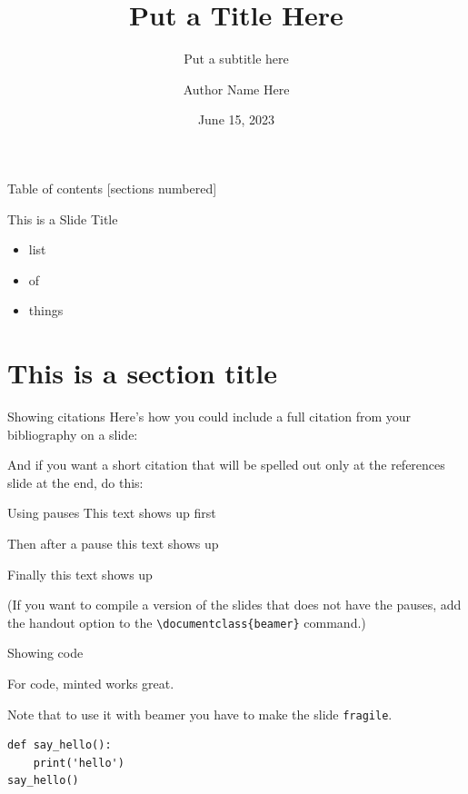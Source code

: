\documentclass[10pt,aspectratio=169,dvipsnames]{beamer}
\title{Put a Title Here}
\subtitle{Put a subtitle here}
\date{June 15, 2023}
\author{Author Name Here}
\begin{document}
\maketitle


\begin{frame}{Table of contents}
[sections numbered]
\tableofcontents[hideallsubsections]
\end{frame}




\begin{frame}{This is a Slide Title}
\begin{itemize}\itemsep1em
\item list
\item of
\item things
\end{itemize}
\end{frame}


\section{This is a section title}

\begin{frame}{Showing citations}
Here's how you could include a full citation from your bibliography on a slide:

\vspace{2em}


\vspace{2em}

And if you want a short citation that will be spelled out only
at the references slide at the end, do this: \cite{oasis1}
\end{frame}

\begin{frame}[fragile]{Using pauses}
This text shows up first
\pause

Then after a pause this text shows up
\pause

Finally this text shows up

(If you want to compile a version of the slides that does not have the pauses, add the handout option
to the \verb|\documentclass{beamer}| command.)

\end{frame}



\begin{frame}[fragile]{Showing code}
	
For code, minted works great.

Note that to use it with beamer you have to make the slide \verb|fragile|.
	
\begin{verbatim}
def say_hello():
	print('hello')
say_hello()
\end{verbatim}
\end{frame}
\end{document}
